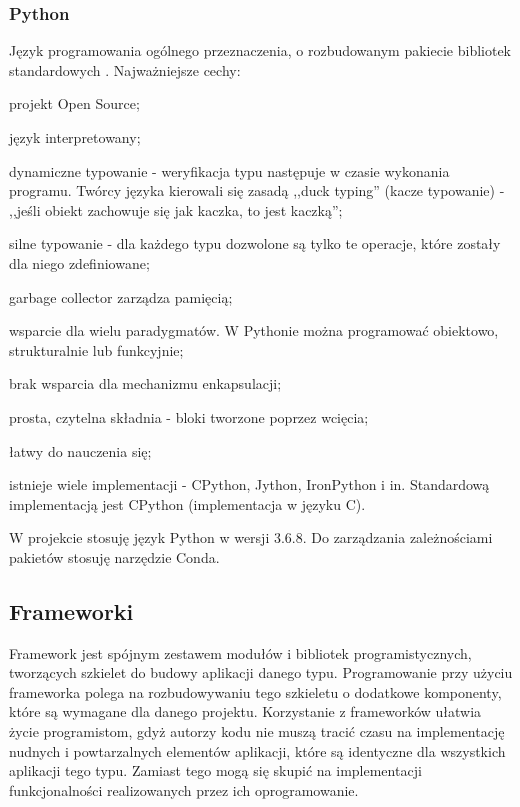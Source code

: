 \subsubsection{Python}
Język programowania ogólnego przeznaczenia, o rozbudowanym pakiecie bibliotek standardowych 
\cite{python:wikipedia}.
Najważniejsze cechy:
\begin{itemize*}
\item projekt Open Source;
\item język interpretowany;
\item dynamiczne typowanie - weryfikacja typu następuje w czasie wykonania programu. Twórcy języka kierowali się zasadą ,,duck typing'' (kacze typowanie) - ,,jeśli obiekt zachowuje się jak kaczka, to jest kaczką'';
\item silne typowanie - dla każdego typu dozwolone są tylko te operacje, które zostały dla niego zdefiniowane;
\item garbage collector zarządza pamięcią;
\item wsparcie dla wielu paradygmatów. W Pythonie można programować obiektowo, strukturalnie lub funkcyjnie;
\item brak wsparcia dla mechanizmu enkapsulacji;
\item prosta, czytelna składnia - bloki tworzone poprzez wcięcia;
\item łatwy do nauczenia się;
\item istnieje wiele implementacji - CPython, Jython, IronPython i in. Standardową implementacją jest CPython (implementacja w języku C).
\end{itemize*}
W projekcie stosuję język Python w wersji 3.6.8. Do zarządzania zależnościami pakietów stosuję narzędzie Conda.

\subsection{Frameworki}
Framework jest spójnym zestawem modułów i bibliotek programistycznych, tworzących szkielet do budowy aplikacji danego typu. Programowanie przy użyciu frameworka polega na rozbudowywaniu tego szkieletu o dodatkowe komponenty, które są wymagane dla danego projektu. Korzystanie z frameworków ułatwia życie programistom, gdyż autorzy kodu nie muszą tracić czasu na implementację nudnych i powtarzalnych elementów aplikacji, które są identyczne dla wszystkich aplikacji tego typu. Zamiast tego mogą się skupić na implementacji funkcjonalności realizowanych przez ich oprogramowanie.
